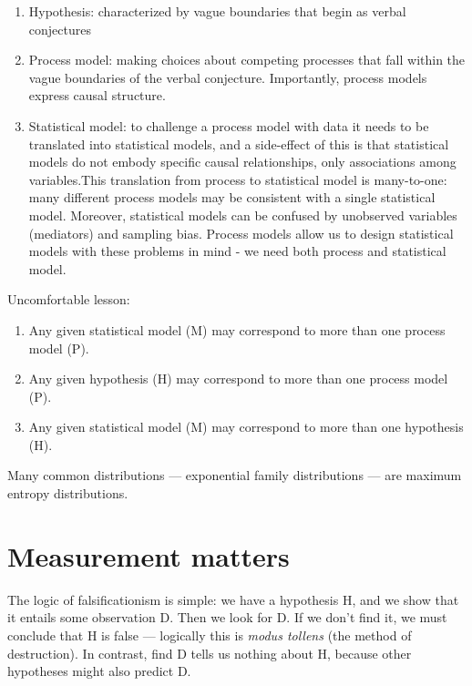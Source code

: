 \documentclass[
]{book}
\providecommand{\tightlist}{%
  \setlength{\itemsep}{0pt}\setlength{\parskip}{0pt}}
\begin{document}
\begin{enumerate}
\def\labelenumi{\arabic{enumi}.}
\tightlist
\item
  Hypothesis: characterized by vague boundaries that begin as verbal conjectures
\item
  Process model: making choices about competing processes that fall within the vague boundaries of the verbal conjecture. Importantly, process models express causal structure.
\item
  Statistical model: to challenge a process model with data it needs to be translated into statistical models, and a side-effect of this is that statistical models do not embody specific causal relationships, only associations among variables.This translation from process to statistical model is many-to-one: many different process models may be consistent with a single statistical model. Moreover, statistical models can be confused by unobserved variables (mediators) and sampling bias. Process models allow us to design statistical models with these problems in mind - we need both process and statistical model.
\end{enumerate}

Uncomfortable lesson:

\begin{enumerate}
\def\labelenumi{\arabic{enumi}.}
\tightlist
\item
  Any given statistical model (M) may correspond to more than one process model (P).
\item
  Any given hypothesis (H) may correspond to more than one process model (P).
\item
  Any given statistical model (M) may correspond to more than one hypothesis (H).
\end{enumerate}

Many common distributions --- exponential family distributions --- are maximum entropy distributions.

\hypertarget{measurement-matters}{%
\section{Measurement matters}\label{measurement-matters}}

The logic of falsificationism is simple: we have a hypothesis H, and we show that it entails some observation D. Then we look for D. If we don't find it, we must conclude that H is false --- logically this is \emph{modus tollens} (the method of destruction). In contrast, find D tells us nothing about H, because other hypotheses might also predict D.
\end{document}
